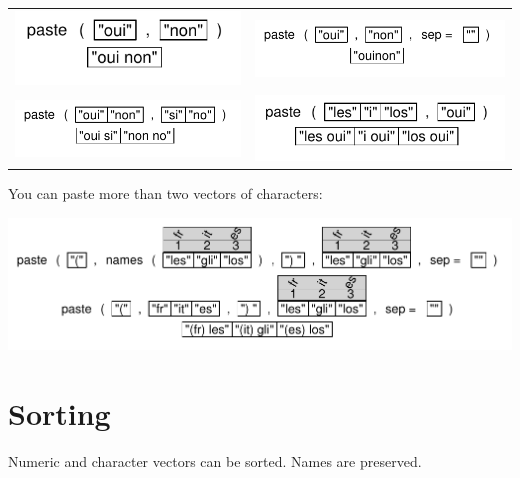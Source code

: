 \documentclass[pdflatex]{article}
\begin{document}
\begin{tabular}{cc}
\includegraphics{paste} & \includegraphics{paste2}\\
\includegraphics{paste3} & \includegraphics{paste4}\\
\end{tabular}

You can paste more than two vectors of characters:

\includegraphics{paste5}

\section{Sorting}

Numeric and character vectors can be sorted. Names are preserved.
\end{document}
